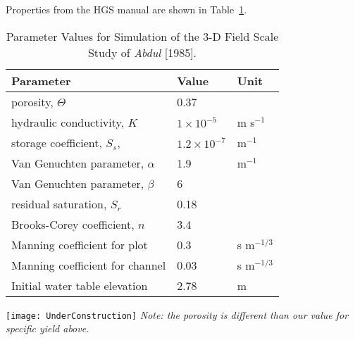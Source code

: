 \label{texfile:3D_Example_Abdul}

Properties from the HGS manual are shown in Table~\ref{tab:abdul}.
    \begin{table}
        \centering
        \caption{Parameter Values for Simulation of the 3-D Field Scale Study of {\em Abdul} [1985].}
        \begin{tabular}{lll}  \hline
            Parameter                                       & Value & Unit \\ \hline
            porosity, $\Theta$                              &  0.37                    & \\
            hydraulic conductivity, $K$                     &  $ 1 \times 10^{-5}$      &m s$^{-1}$ \\
            storage coefficient, $S_s$,                     &  $ 1.2 \times 10^{-7}$    & m$^{-1}$\\
            Van Genuchten parameter, $\alpha$               &  1.9                     &m$^{-1}$ \\
            Van Genuchten parameter, $\beta$                &  6                       & \\
            residual saturation, $S_r$                      &  0.18                    & \\
            Brooks-Corey coefficient, $n$                   &  3.4                     & \\
            Manning coefficient for plot                   &  0.3                     &s m$^{-1/3}$ \\
            Manning coefficient for channel                &  0.03                    &s m$^{-1/3}$ \\
            Initial water table elevation                   &  2.78                    &m \\
        \hline
        \end{tabular}
        \label{tab:abdul}
    \end{table}

\texttt{[image: UnderConstruction]} \textit{Note: the porosity is different than our value for specific yield above.} 